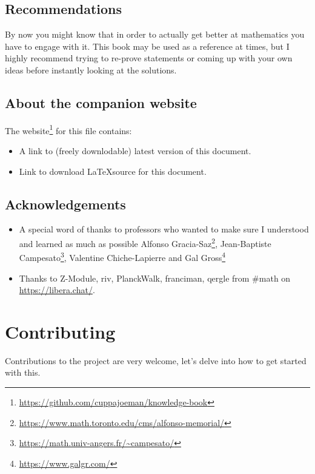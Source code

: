 \section*{Recommendations}
By now you might know that in order to actually get better at mathematics you have to engage with it. This book may be used as a reference at times, but I highly recommend trying to re-prove statements or coming up with your own ideas before instantly looking at the solutions.

\section*{About the companion website}
The website\footnote{\url{https://github.com/cuppajoeman/knowledge-book}} for this file contains:
\begin{itemize}
  \item A link to (freely downlodable) latest version of this document.
  \item Link to download \LaTeX source for this document.
\end{itemize}

\section*{Acknowledgements}
\begin{itemize}
    \item A special word of thanks to professors who wanted to make sure I understood and learned as much as possible Alfonso Gracia-Saz\footnote{\url{https://www.math.toronto.edu/cms/alfonso-memorial/}}, Jean-Baptiste Campesato\footnote{\url{https://math.univ-angers.fr/~campesato/}}, Valentine Chiche-Lapierre and Gal Gross\footnote{\url{https://www.galgr.com/}}
    \item Thanks to Z-Module, riv, PlanckWalk, franciman, qergle from \#math on \url{https://libera.chat/}.
\end{itemize}

\chapter*{Contributing}
 
Contributions to the project are very welcome, let's delve into how to get started with this.

